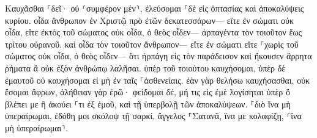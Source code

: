 \documentclass{openreader}
\begin{document}
Καυχᾶσθαι ⸀δεῖ· οὐ ⸂συμφέρον μέν⸃, ἐλεύσομαι ⸀δὲ εἰς ὀπτασίας καὶ ἀποκαλύψεις κυρίου. 
οἶδα ἄνθρωπον ἐν Χριστῷ πρὸ ἐτῶν δεκατεσσάρων— εἴτε ἐν σώματι οὐκ οἶδα, εἴτε ἐκτὸς τοῦ σώματος οὐκ οἶδα, ὁ θεὸς οἶδεν— ἁρπαγέντα τὸν τοιοῦτον ἕως τρίτου οὐρανοῦ. 
καὶ οἶδα τὸν τοιοῦτον ἄνθρωπον— εἴτε ἐν σώματι εἴτε ⸀χωρὶς τοῦ σώματος οὐκ οἶδα, ὁ θεὸς οἶδεν— 
ὅτι ἡρπάγη εἰς τὸν παράδεισον καὶ ἤκουσεν ἄρρητα ῥήματα ἃ οὐκ ἐξὸν ἀνθρώπῳ λαλῆσαι. 
ὑπὲρ τοῦ τοιούτου καυχήσομαι, ὑπὲρ δὲ ἐμαυτοῦ οὐ καυχήσομαι εἰ μὴ ἐν ταῖς ⸀ἀσθενείαις. 
ἐὰν γὰρ θελήσω καυχήσασθαι, οὐκ ἔσομαι ἄφρων, ἀλήθειαν γὰρ ἐρῶ· φείδομαι δέ, μή τις εἰς ἐμὲ λογίσηται ὑπὲρ ὃ βλέπει με ἢ ἀκούει ⸀τι ἐξ ἐμοῦ, 
καὶ τῇ ὑπερβολῇ τῶν ἀποκαλύψεων. ⸀διὸ ἵνα μὴ ὑπεραίρωμαι, ἐδόθη μοι σκόλοψ τῇ σαρκί, ἄγγελος ⸀Σατανᾶ, ἵνα με κολαφίζῃ, ⸂ἵνα μὴ ὑπεραίρωμαι⸃. 
\end{document}
